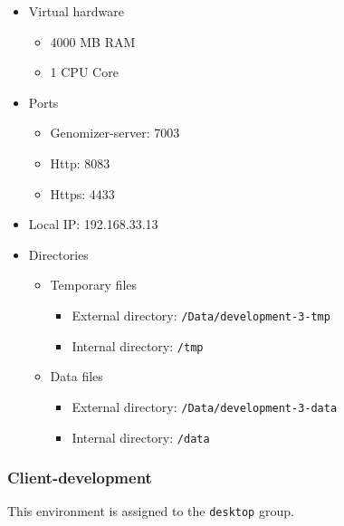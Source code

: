\begin{itemize}
\itemsep1pt\parskip0pt
\item
  Virtual hardware

  \begin{itemize}
  \itemsep1pt\parskip0pt
  \item
    4000 MB RAM
  \item
    1 CPU Core
  \end{itemize}
\item
  Ports

  \begin{itemize}
  \itemsep1pt\parskip0pt
  \item
    Genomizer-server: 7003
  \item
    Http: 8083
  \item
    Https: 4433
  \end{itemize}
\item
  Local IP: 192.168.33.13
\item
  Directories

  \begin{itemize}
  \itemsep1pt\parskip0pt
  \item
    Temporary files

    \begin{itemize}
    \itemsep1pt\parskip0pt
    \item
      External directory: \texttt{/Data/development-3-tmp}
    \item
      Internal directory: \texttt{/tmp}
    \end{itemize}
  \item
    Data files

    \begin{itemize}
    \itemsep1pt\parskip0pt
    \item
      External directory: \texttt{/Data/development-3-data}
    \item
      Internal directory: \texttt{/data}
    \end{itemize}
  \end{itemize}
\end{itemize}

\subsubsection{Client-development}\label{client-development}

This environment is assigned to the \texttt{desktop} group.

